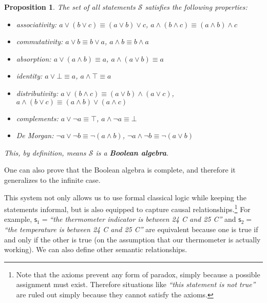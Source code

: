 \documentclass[%
reprint,
amsmath,amssymb,
aps,
prx,
]{revtex4-1}
\theoremstyle{plain}%
\newtheorem{prop}[thrm]{Proposition}
\theoremstyle{definition}
\theoremstyle{remark}
\def\tautology{\top}
\def\contradiction{\bot}
\def\AND{\wedge}
\def\OR{\vee}
\def\NOT{\neg}
\newcommand{\stmt}[1][s] {\mathsf{#1}}
\newcommand{\statement}[1] {\emph{``#1''}}
\begin{document}
\begin{prop}\label{boolean_properties}
	The set of all statements $\mathcal{S}$ satisfies the following properties:
	\begin{itemize}
		\item associativity: $a \OR (b \OR c) \equiv (a \OR b) \OR c$, $a \AND (b \AND c) \equiv (a \AND b) \AND c$
		\item commutativity: $a \OR b \equiv b \OR a$, $a \AND b \equiv b \AND a$
		\item absorption: $a \OR (a \AND b) \equiv a$, $a \AND (a \OR b) \equiv a$
		\item identity: $a \OR \contradiction \equiv a
		$, $a \AND \tautology \equiv a$
		\item distributivity: $a \OR (b \AND c) \equiv (a \OR b) \AND (a \OR c)$, $a \AND (b \OR c) \equiv (a \AND b) \OR (a \AND c)$
		\item complements: $a \OR \NOT a \equiv \tautology$, $a \AND \NOT a \equiv \contradiction$
		\item De Morgan: $\NOT a \OR \NOT b \equiv \NOT (a \AND b)$, $\NOT a \AND \NOT b \equiv \NOT (a \OR b)$
	\end{itemize}
	This, by definition, means $\mathcal{S}$ is a \textbf{Boolean algebra}.
\end{prop}

One can also prove that the Boolean algebra is complete, and therefore it generalizes to the infinite case.

This system not only allows us to use formal classical logic while keeping the statements informal, but is also equipped to capture causal relationships.\footnote{Note that the axioms prevent any form of paradox, simply because a possible assignment must exist. Therefore situations like \statement{this statement is not true} are ruled out simply because they cannot satisfy the axioms.} For example, $\stmt_1=$\statement{the thermometer indicator is between 24 C and 25 C} and $\stmt_2=$\statement{the temperature is between 24 C and 25 C} are equivalent because one is true if and only if the other is true (on the assumption that our thermometer is actually working). We can also define other semantic relationships.
\end{document}
